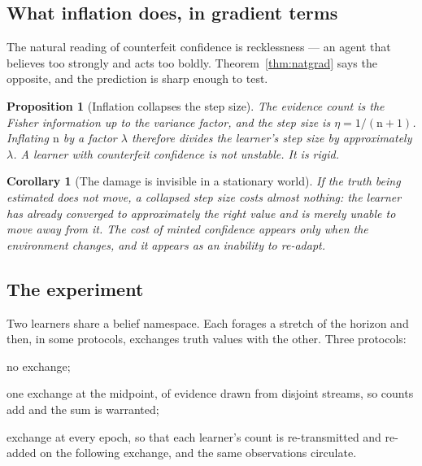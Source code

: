 \documentclass[11pt,a4paper]{article}
\theoremstyle{plain}
\newtheorem{proposition}[theorem]{Proposition}
\newtheorem{corollary}[theorem]{Corollary}
\theoremstyle{definition}
\theoremstyle{remark}
\newcommand{\ev}{\mathrm{n}}
\begin{document}
\subsection{What inflation does, in gradient terms}

The natural reading of counterfeit confidence is recklessness --- an agent that
believes too strongly and acts too boldly. Theorem~\ref{thm:natgrad} says the
opposite, and the prediction is sharp enough to test.

\begin{proposition}[Inflation collapses the step size]\label{prop:freeze}
The evidence count is the Fisher information up to the variance factor, and the
step size is $\eta = 1/(\ev+1)$. Inflating $\ev$ by a factor $\lambda$ therefore
divides the learner's step size by approximately $\lambda$. A learner with
counterfeit confidence is not unstable. It is rigid.
\end{proposition}

\begin{corollary}[The damage is invisible in a stationary world]\label{cor:invisible}
If the truth being estimated does not move, a collapsed step size costs almost
nothing: the learner has already converged to approximately the right value and
is merely unable to move away from it. The cost of minted confidence appears only
when the environment changes, and it appears as an inability to re-adapt.
\end{corollary}

\subsection{The experiment}

Two learners share a belief namespace. Each forages a stretch of the horizon and
then, in some protocols, exchanges truth values with the other. Three protocols:

\begin{description}[leftmargin=1.6em,itemsep=2pt]
\item[isolated] no exchange;
\item[honest] one exchange at the midpoint, of evidence drawn from disjoint
streams, so counts add and the sum is warranted;
\item[plagiarism] exchange at every epoch, so that each learner's count is
re-transmitted and re-added on the following exchange, and the same observations
circulate.
\end{description}
\end{document}
